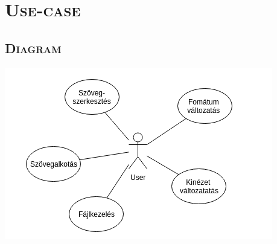 \documentclass[12pt]{article}
\begin{document}
\section*{\textsc{Use-case}}
\subsection*{\textsc{Diagram}}
\includegraphics{useCase}
\end{document}

